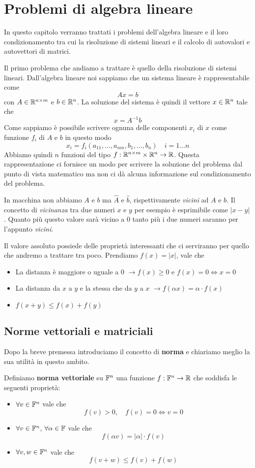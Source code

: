 \chapter{Problemi di algebra lineare}
In questo capitolo verranno trattati i problemi dell'algebra lineare e il loro condizionamento tra cui la
risoluzione di sistemi lineari e il calcolo di autovalori e autovettori di matrici.

Il primo problema che andiamo a trattare è quello della risoluzione di sistemi lineari. Dall'algebra lineare
noi sappiamo che un sistema lineare è rappresentabile come
\[ A x = b \]
con $A \in \mathbb{R}^{n \times m}$ e $b \in \mathbb{R}^n$. La soluzione del sistema è quindi il vettore $x \in \mathbb{R}^n$ tale che
\[ x = A^{-1} b \]
Come sappiamo è possibile scrivere ognuna delle componenti $x_i$ di $x$ come funzione $f_i$ di $A$ e $b$ in
questo modo
\[ x_i = f_i (a_{11}, \dots, a_{nm}, b_1, \dots, b_n) \quad i = 1 \dots n \]
Abbiamo quindi $n$ funzioni del tipo $f : \mathbb{R}^{n \times m} \times \mathbb{R}^n \to \mathbb{R}$. Questa rappresentazione ci
fornisce un modo per scrivere la soluzione del problema dal punto di vista matematico ma non ci dà alcuna
informazione sul condizionamento del problema.

In macchina non abbiamo $A$ e $b$ ma $\hat{A}$ e $\hat{b}$, rispettivamente \emph{vicini} ad $A$ e $b$. Il
concetto di \emph{vicinanza} tra due numeri $x$ e $y$ per esempio è esprimibile come $|x - y|$. Quanto più
questo valore sarà vicino a 0 tanto più i due numeri saranno per l'appunto \emph{vicini}.

Il valore assoluto possiede delle proprietà interessanti che ci serviranno per quello che andremo a trattare
tra poco. Prendiamo $f(x) = |x|$, vale che
\begin{itemize}
	\item La distanza è maggiore o uguale a 0 $\to f(x) \geq 0$ e $f(x) = 0 \Leftrightarrow x = 0$
	\item La distanza da $x$ a $y$ e la stessa che da $y$ a $x$ $\to f(\alpha x) = \alpha \cdot f(x)$
	\item $f(x + y) \leq f(x) + f(y)$
\end{itemize}

\section{Norme vettoriali e matriciali}
Dopo la breve premessa introduciamo il concetto di \textbf{norma} e chiariamo meglio la sua utilità in questo
ambito.

\begin{definition}
	Definiamo \textbf{norma vettoriale} su $\mathbb{F}^n$ una funzione $f : \mathbb{F}^n \to \mathbb{R}$ che soddisfa le seguenti
	proprietà:
	\begin{itemize}
		\item $\forall v \in \mathbb{F}^n$ vale che
		      \[ f(v) > 0, \quad f(v) = 0 \Leftrightarrow v = 0 \]
		\item $\forall v \in \mathbb{F}^n$, $\forall \alpha \in \mathbb{F}$ vale che
		      \[ f(\alpha v) = |\alpha| \cdot f(v) \]
		\item $\forall v, w \in \mathbb{F}^n$ vale che
		      \[ f(v + w) \leq f(v) + f(w) \]
	\end{itemize}
\end{definition}

